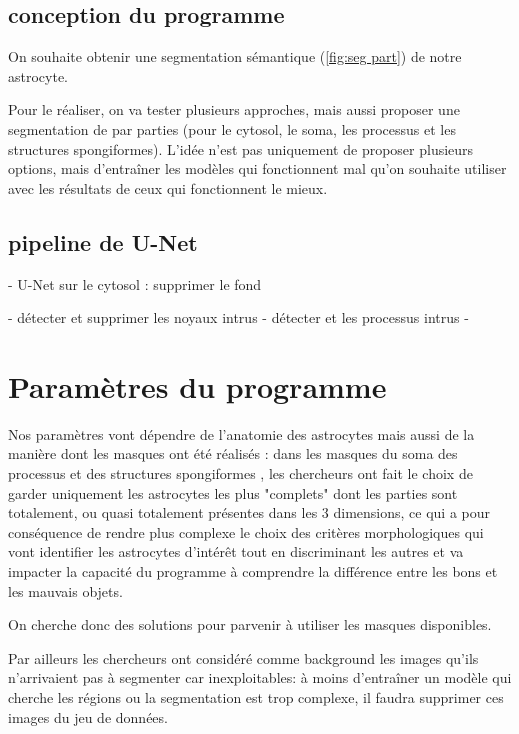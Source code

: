 \documentclass[10pt]{scrartcl}
\begin{document}
\subsection{conception du programme}

On souhaite obtenir une segmentation sémantique (\ref{fig:seg part}) de notre astrocyte. 

Pour le réaliser, on va tester plusieurs approches,  mais aussi proposer une segmentation de par parties (pour le cytosol, le soma, les processus et les structures spongiformes).
L'idée n'est pas uniquement de proposer plusieurs options, mais d'entraîner les modèles qui fonctionnent mal qu'on souhaite utiliser avec les résultats de ceux qui fonctionnent le mieux.


\subsection{pipeline de U-Net}

- U-Net sur le cytosol : supprimer le fond 


- détecter et supprimer les noyaux intrus 
- détecter et les processus intrus 
- 




\section{Paramètres du programme}
Nos paramètres vont dépendre de l'anatomie des astrocytes mais aussi de la manière dont les masques ont été réalisés : dans les masques du soma des processus et des structures spongiformes , les chercheurs ont fait le choix de garder uniquement les astrocytes les plus "complets" dont les parties sont totalement, ou quasi totalement présentes dans les 3 dimensions, ce qui a pour conséquence de rendre plus complexe le choix des critères morphologiques qui vont identifier les astrocytes d'intérêt tout en discriminant les autres et va impacter la capacité du programme à comprendre la différence entre les bons et les mauvais objets.

On cherche donc des solutions pour parvenir à utiliser les masques disponibles. 

Par ailleurs les chercheurs ont considéré comme background les images qu'ils n'arrivaient pas à segmenter car inexploitables: à moins d'entraîner un modèle qui cherche les régions ou la segmentation est trop complexe, il faudra supprimer ces images du jeu de données.
\end{document}
